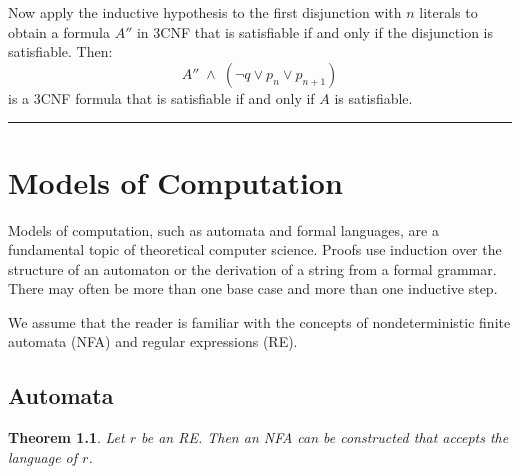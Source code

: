 \documentclass[11pt,a4paper]{report}
\newcommand*{\qed}{\hfill\rule{1ex}{1.5ex}}
\newtheorem{theorem}{Theorem}
\begin{document}
Now apply the inductive hypothesis to the first disjunction with $n$ literals to obtain a formula $A''$ in 3CNF that is satisfiable if and only if the disjunction is satisfiable. Then:
\begin{displaymath}
A'' \;\wedge\; (\neg q \vee p_n \vee p_{n+1})
\end{displaymath}
is a 3CNF formula that is satisfiable if and only if $A$ is satisfiable.\qed


\chapter{Models of Computation}\label{s.models}

Models of computation, such as automata and formal languages, are a fundamental topic of theoretical computer science. Proofs use induction over the structure of an automaton or the derivation of a string from a formal grammar. There may often be more than one base case and more than one inductive step.

We assume that the reader is familiar with the concepts of nondeterministic finite automata (NFA) and regular expressions (RE).

\section{Automata}

\begin{theorem}
Let $r$ be an RE. Then an NFA can be constructed that accepts the language of $r$.
\end{theorem}
\end{document}
